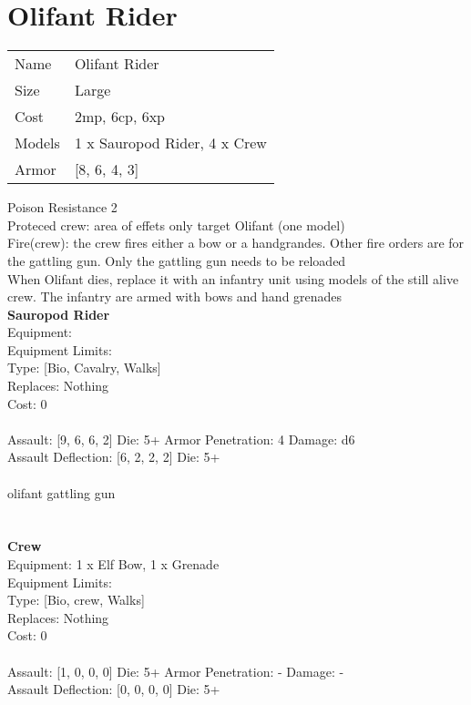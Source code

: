 \pagebreak\pagebreak

\section{ Olifant Rider }

\begin{tabular}{ll}
  Name & Olifant Rider \\
  Size & Large\\
  Cost & 2mp, 6cp, 6xp\\
  Models & 1 x Sauropod Rider, 4 x Crew\\
  Armor & [8, 6, 4, 3]\\
\end{tabular}

\noindent Poison Resistance 2\\ 
Proteced crew: area of effets only target Olifant (one model)\\ 
Fire(crew): the crew fires either a bow or a handgrandes. Other fire orders are for the gattling gun. Only the gattling gun needs to be reloaded\\ 
When Olifant dies, replace it with an infantry unit using models of the still alive crew. The infantry are armed with bows and hand grenades\\ 


{\bf Sauropod Rider } \\
Equipment:  \\
Equipment Limits:  \\
Type: [Bio, Cavalry, Walks] \\
Replaces: Nothing \\
Cost: 0\\
\ \\
Assault: [9, 6, 6, 2] Die: 5+ Armor Penetration: 4 Damage: d6 \\
Assault Deflection: [6, 2, 2, 2] Die: 5+\\
\indent  
\ \\
olifant gattling gun\\ 

\ \\
 
\ \\

{\bf Crew } \\
Equipment: 1 x Elf Bow, 1 x Grenade \\
Equipment Limits:  \\
Type: [Bio, crew, Walks] \\
Replaces: Nothing \\
Cost: 0\\
\ \\
Assault: [1, 0, 0, 0] Die: 5+ Armor Penetration: - Damage: - \\
Assault Deflection: [0, 0, 0, 0] Die: 5+\\
\indent  
\ \\

